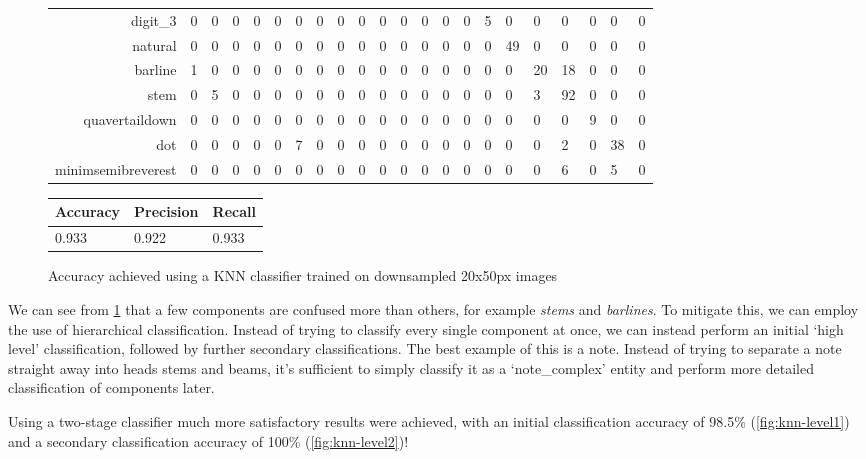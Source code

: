 \begin{figure}[H]
\begin{subtable}[b]{\linewidth}
\begin{tabularx}{\textwidth}{r|XXXXXXXXXXXXXXXXXXXXX}
    digit\_3 & 0 & 0 & 0 & 0 & 0 & 0 & 0 & 0 & 0 & 0 & 0 & 0 & 0 & 0 & 5 & 0 & 0 & 0 & 0 & 0 & 0 \\
    natural & 0 & 0 & 0 & 0 & 0 & 0 & 0 & 0 & 0 & 0 & 0 & 0 & 0 & 0 & 0 & 49 & 0 & 0 & 0 & 0 & 0 \\
    barline & 1 & 0 & 0 & 0 & 0 & 0 & 0 & 0 & 0 & 0 & 0 & 0 & 0 & 0 & 0 & 0 & 20 & 18 & 0 & 0 & 0 \\
    stem & 0 & 5 & 0 & 0 & 0 & 0 & 0 & 0 & 0 & 0 & 0 & 0 & 0 & 0 & 0 & 0 & 3 & 92 & 0 & 0 & 0 \\
    quavertaildown & 0 & 0 & 0 & 0 & 0 & 0 & 0 & 0 & 0 & 0 & 0 & 0 & 0 & 0 & 0 & 0 & 0 & 0 & 9 & 0 & 0 \\
    dot & 0 & 0 & 0 & 0 & 0 & 7 & 0 & 0 & 0 & 0 & 0 & 0 & 0 & 0 & 0 & 0 & 0 & 2 & 0 & 38 & 0 \\
    minimsemibreverest & 0 & 0 & 0 & 0 & 0 & 0 & 0 & 0 & 0 & 0 & 0 & 0 & 0 & 0 & 0 & 0 & 0 & 6 & 0 & 5 & 0 \\
    \end{tabularx}
  \end{subtable}
  \vspace{0.8cm}
  \begin{subtable}[b]{.4\linewidth}
    \begin{tabularx}{\linewidth}{lll}
      \toprule
      Accuracy & Precision & Recall \\
      \midrule
      0.933 & 0.922 & 0.933 \\
      \bottomrule
    \end{tabularx}
  \end{subtable}
  \caption{Accuracy achieved using a KNN classifier trained on downsampled 20x50px images}
  \label{table:knn-naive-matrix}
\end{figure}

We can see from \cref{table:knn-naive-matrix} that a few components are confused more than others, for example \emph{stems} and \emph{barlines}. To mitigate this, we can employ the use of hierarchical classification. Instead of trying to classify every single component at once, we can instead perform an initial `high level' classification, followed by further secondary classifications. The best example of this is a note. Instead of trying to separate a note straight away into heads stems and beams, it's sufficient to simply classify it as a `note\_complex' entity and perform more detailed classification of components later.

Using a two-stage classifier much more satisfactory results were achieved, with an initial classification accuracy of 98.5\% (\cref{fig:knn-level1}) and a secondary classification accuracy of 100\% (\cref{fig:knn-level2})!

